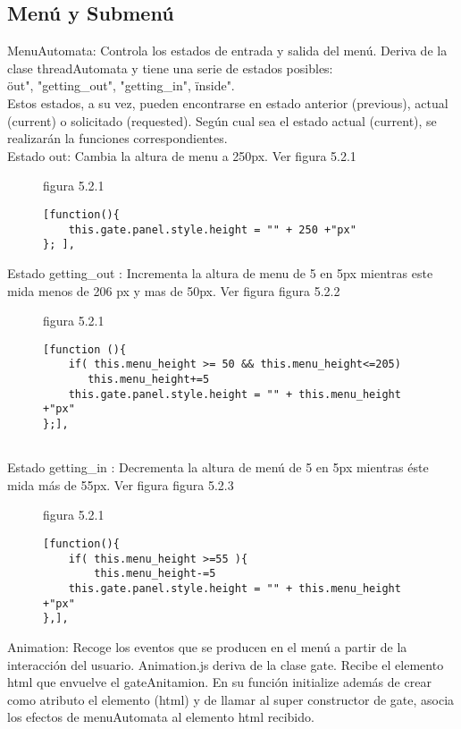 \subsection{Menú y Submenú}
\label{subsection:menu}

MenuAutomata: Controla los estados de entrada y salida del menú. Deriva de la clase threadAutomata y tiene una serie de estados posibles:\\
\"out", "getting\_out", "getting\_in", \"inside".\\
Estos estados, a su vez, pueden encontrarse en estado anterior (previous), actual (current) o solicitado (requested). Según cual sea  el estado 
actual (current), se realizarán la funciones correspondientes.\\

Estado out: Cambia la altura de menu a 250px. Ver figura 5.2.1
 
\begin{figure}[p]
figura 5.2.1
\begin{verbatim}
[function(){
    this.gate.panel.style.height = "" + 250 +"px" 
}; ],
\end{verbatim}
\end{figure}

Estado getting\_out : Incrementa la altura de menu de 5 en 5px  mientras este mida menos de 206 px y mas de 50px. Ver figura figura 5.2.2

\begin{figure}[p]
figura 5.2.1
\begin{verbatim}
[function (){
    if( this.menu_height >= 50 && this.menu_height<=205)
       this.menu_height+=5
    this.gate.panel.style.height = "" + this.menu_height +"px"
};],
 
\end{verbatim}
\end{figure}
            
Estado  getting\_in : Decrementa la altura de menú de 5 en 5px  mientras éste mida  más de 55px. Ver figura figura 5.2.3

\begin{figure}[p]
figura 5.2.1
\begin{verbatim}
[function(){
    if( this.menu_height >=55 ){         
        this.menu_height-=5
    this.gate.panel.style.height = "" + this.menu_height +"px"
},],
\end{verbatim}
\end{figure}
        
Animation: Recoge los eventos que se producen en el menú a partir de la interacción del usuario. Animation.js deriva de la clase gate.
Recibe el elemento html que envuelve  el gateAnitamion. En su función initialize además de crear como atributo  el elemento (html) y de llamar
al super constructor de gate, asocia los efectos de menuAutomata al elemento html recibido.\\

